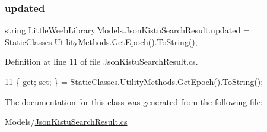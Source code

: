 \subsubsection{\texorpdfstring{updated}{updated}}
{\footnotesize\ttfamily string Little\+Weeb\+Library.\+Models.\+Json\+Kistu\+Search\+Result.\+updated = \mbox{\hyperlink{class_little_weeb_library_1_1_static_classes_1_1_utility_methods_a12336d9e64983ddabaad8950486fafb2}{Static\+Classes.\+Utility\+Methods.\+Get\+Epoch}}().\mbox{\hyperlink{class_little_weeb_library_1_1_models_1_1_json_kistu_search_result_a24e08aec40ba54db7235bb4ef9be8b11}{To\+String}}()\hspace{0.3cm}{\ttfamily [get]}, {\ttfamily [set]}}



Definition at line 11 of file Json\+Kistu\+Search\+Result.\+cs.


\begin{DoxyCode}
11 \{ \textcolor{keyword}{get}; \textcolor{keyword}{set}; \} = StaticClasses.UtilityMethods.GetEpoch().ToString();
\end{DoxyCode}


The documentation for this class was generated from the following file\+:\begin{DoxyCompactItemize}
\item 
Models/\mbox{\hyperlink{_json_kistu_search_result_8cs}{Json\+Kistu\+Search\+Result.\+cs}}\end{DoxyCompactItemize}
